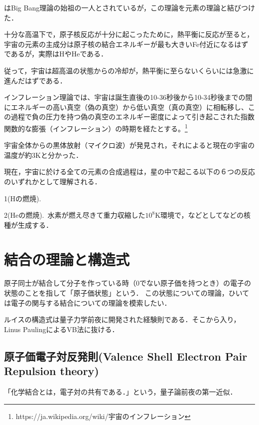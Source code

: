 \documentclass[uplatex, 12pt, dvipdfmx]{jsreport}
\begin{document}
はBig Bang理論の始祖の一人とされているが，この理論を元素の理論と結びつけた．
\begin{hypothesis}[Gamowのinflation理論]\rm{}
    十分な高温下で，原子核反応が十分に起こったために，熱平衡に反応が至ると，宇宙の元素の主成分は原子核の結合エネルギーが最も大きいFe付近になるはずであるが，実際はHやHeである．

    従って，宇宙は超高温の状態からの冷却が，熱平衡に至らないくらいには急激に進んだはずである．
\end{hypothesis}
\begin{theory}
    インフレーション理論では、宇宙は誕生直後の10-36秒後から10-34秒後までの間にエネルギーの高い真空（偽の真空）から低い真空（真の真空）に相転移し、この過程で負の圧力を持つ偽の真空のエネルギー密度によって引き起こされた指数関数的な膨張（インフレーション）の時期を経たとする。\footnote{https://ja.wikipedia.org/wiki/宇宙のインフレーション}
\end{theory}
\begin{fact}[1965]
    宇宙全体からの黒体放射（マイクロ波）が発見され，それによると現在の宇宙の温度が約$3\si{\kelvin}$と分かった．
\end{fact}
\begin{hypothesis}
    現在，宇宙に於ける全ての元素の合成過程は，星の中で起こる以下の６つの反応のいずれかとして理解される．\rm{}

    1(Hの燃焼).\, 

    2(Heの燃焼).\, 水素が燃え尽きて重力収縮した$10^8\si{\kelvin}$環境で，などとしてなどの核種が生成する．
\end{hypothesis}

\chapter{結合の理論と構造式}

原子同士が結合して分子を作っている時（0でない原子価を持つとき）の電子の状態のことを指して「原子価状態」という．
この状態についての理論，ひいては電子の関与する結合についての理論を模索したい．

ルイスの構造式は量子力学前夜に開発された経験則である．そこから入り，Linus PaulingによるVB法に抜ける．

\section{原子価電子対反発則(Valence Shell Electron Pair Repulsion theory)}
「化学結合とは，電子対の共有である．」という，量子論前夜の第一近似．
\end{document}

